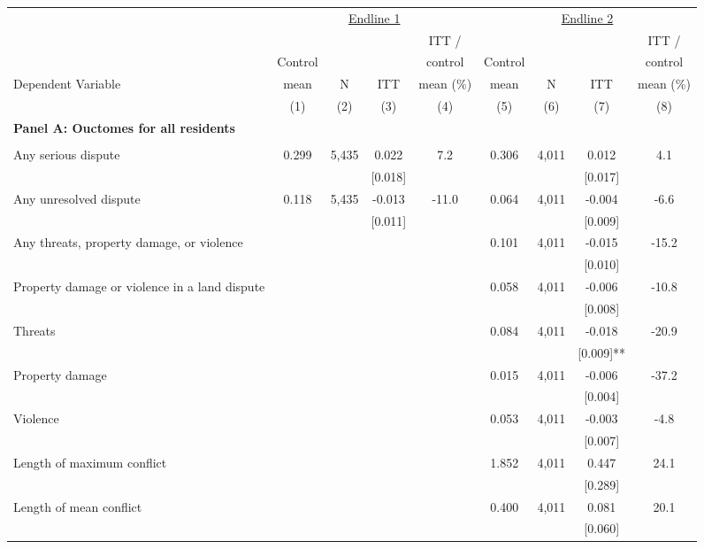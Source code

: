 \begin{tabular}{lcccccccc}
\hline \noalign{\smallskip} & \multicolumn{4}{c}{\uline{\hfill Endline 1 \hfill}} & \multicolumn{4}{c}{\uline{\hfill Endline 2 \hfill}}\\
 &  &  &  & ITT /  &  &  &  & ITT /\\
 & Control &  &  & control & Control &  &  & control\\
Dependent Variable & mean & N & ITT & mean (\%) & mean & N & ITT & mean (\%)\\
 & (1) & (2) & (3) & (4) & (5) & (6) & (7) & (8)\\
\noalign{\smallskip}\hline \noalign{\smallskip}\textbf{Panel A: Ouctomes for all residents} &  &  &  &  &  &  &  & \\
 &  &  &  &  &  &  &  & \\
Any serious dispute & 0.299 & 5,435 & 0.022 & 7.2 & 0.306 & 4,011 & 0.012 & 4.1\\
 &  &  & [0.018] &  &  &  & [0.017] & \\
Any unresolved dispute & 0.118 & 5,435 & -0.013 & -11.0 & 0.064 & 4,011 & -0.004 & -6.6\\
 &  &  & [0.011] &  &  &  & [0.009] & \\
\phantom{} Any threats, property damage, or violence &  &  &  &  & 0.101 & 4,011 & -0.015 & -15.2\\
 &  &  &  &  &  &  & [0.010] & \\
\quad Property damage or violence in a land dispute &  &  &  &  & 0.058 & 4,011 & -0.006 & -10.8\\
 &  &  &  &  &  &  & [0.008] & \\
\quad Threats &  &  &  &  & 0.084 & 4,011 & -0.018 & -20.9\\
 &  &  &  &  &  &  & [0.009]** & \\
\quad Property damage &  &  &  &  & 0.015 & 4,011 & -0.006 & -37.2\\
 &  &  &  &  &  &  & [0.004] & \\
\quad Violence &  &  &  &  & 0.053 & 4,011 & -0.003 & -4.8\\
 &  &  &  &  &  &  & [0.007] & \\
Length of maximum conflict &  &  &  &  & 1.852 & 4,011 & 0.447 & 24.1\\
 &  &  &  &  &  &  & [0.289] & \\
\quad Length of mean conflict &  &  &  &  & 0.400 & 4,011 & 0.081 & 20.1\\
 &  &  &  &  &  &  & [0.060] & \\

\end{tabular}
